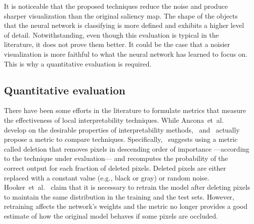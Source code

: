 \documentclass[preprint,12pt]{elsarticle}
\begin{document}
%  

It is noticeable that the proposed techniques reduce the noise and produce sharper visualization than the original saliency map. The shape of the objects that the neural network is classifying is more defined and exhibits a higher level of detail. Notwithstanding, even though this evaluation is typical in the literature, it does not prove them better. It could be the case that a noisier visualization is more faithful to what the neural network has learned to focus on. This is why a quantitative evaluation is required.

\subsection{Quantitative evaluation}
There have been some efforts in the literature to formulate metrics that measure the effectiveness of local interpretability techniques. While Ancona~et~al.~\cite{Ancona2018} develop on the desirable properties of interpretability methods,~\cite{Petsiuk2018} and~\cite{hookerBenchmarkInterpretabilityMethods2019} actually propose a metric to compare techniques. Specifically,~\cite{Petsiuk2018} suggests using a metric called deletion that removes pixels in descending order of importance ---according to the technique under evaluation--- and recomputes the probability of the correct output for each fraction of deleted pixels. Deleted pixels are either replaced with a constant value (e.g., black or gray) or random noise. Hooker~et~al.~\cite{hookerBenchmarkInterpretabilityMethods2019} claim that it is necessary to retrain the model after deleting pixels to maintain the same distribution in the training and the test sets. However, retraining affects the network's weights and the metric no longer provides a good estimate of how the original model behaves if some pixels are occluded.
\end{document}
